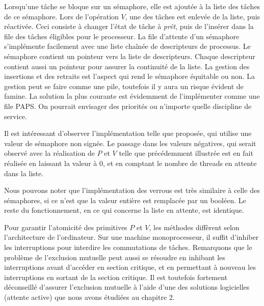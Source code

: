 Lorsqu'une tâche se bloque sur un sémaphore, elle est ajoutée à la liste des tâches de ce sémaphore. Lors de l'opération $V$, une des tâches est enlevée de la liste, puis réactivée. Ceci consiste à changer l'état de tâche à {\em prêt}, puis de l'insérer dans la file des tâches éligibles pour le processeur. La file d'attente d'un sémaphore s'implémente facilement avec une liste chaînée de descripteurs de processus. Le sémaphore contient un pointeur vers la liste de descripteurs.  Chaque descripteur contient aussi un pointeur pour assurer la continuité de la liste. La gestion des insertions et des retraits est l'aspect qui rend le sémaphore équitable ou non.  La gestion peut se faire comme une pile, toutefois il y aura un risque évident de famine.  La solution la plus courante est évidemment de l'implémenter comme une file PAPS.  On pourrait envisager des priorités ou n'importe quelle discipline de service.
\par
Il est intéressant d'observer l'implémentation telle que proposée, qui utilise une valeur de sémaphore non signée. Le passage dans les valeurs négatives, qui serait observé avec la réalisation de $P$ et $V$ telle que précédemment illustrée est en fait réalisée en laissant la valeur à 0, et en comptant le nombre de threads en attente dans la liste.
\par
Nous pouvons noter que l'implémentation des verrous est très similaire à celle des sémaphores, si ce n'est que la valeur entière est remplacée par un booléen. Le reste du fonctionnement, en ce qui concerne la liste en attente, est identique.
\par
Pour garantir l'atomicité des primitives $P$ et $V$, les méthodes diffèrent selon l'architecture de l'ordinateur.
Sur une machine monoprocesseur, il suffit d'inhiber les interruptions pour interdire les commutations de tâches.  Remarquons que le problème de l'exclusion mutuelle peut aussi se résoudre en inhibant les interruptions avant d'accéder en section critique, et en permettant à nouveau les interruptions en sortant de la section critique.
Il est toutefois fortement déconseillé d'assurer l'exclusion mutuelle à l'aide d'une des solutions logicielles (attente active) que nous avons étudiées au chapitre 2.

